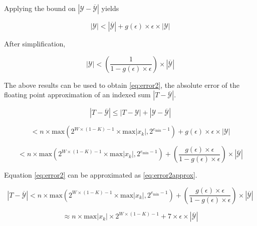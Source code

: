 \documentclass[12pt]{article}
\providecommand{\min}{\ensuremath{\text{min}}}
\providecommand{\max}{\ensuremath{\text{max}}}
\theoremstyle{definition}
\numberwithin{equation}{section}
\numberwithin{figure}{section}
\begin{document}
    Applying the bound on $|\mathcal{Y} - \overline{\mathcal{Y}}|$ yields

    \begin{equation*}
      |\mathcal{Y}| < |\overline{\mathcal{Y}}| + g(\epsilon)\times\epsilon\times|\mathcal{Y}|
    \end{equation*}

    After simplification,

    \begin{equation*}
      |\mathcal{Y}| < (\frac{1}{1 - g(\epsilon)\times\epsilon}) \times |\overline{\mathcal{Y}}|
    \end{equation*}

    The above results can be used to obtain  \eqref{eq:error2}, the absolute error of the floating point approximation of an indexed sum $|T - \overline{\mathcal{Y}}|$.

    \begin{equation*}
      |T - \overline{\mathcal{Y}}| \leq |T - \mathcal{Y}| + |\mathcal{Y} - \overline{\mathcal{Y}}|
    \end{equation*}

    \begin{equation*}
      < n \times \max(2^{W \times (1 - K) - 1} \times \max|x_k|, 2^{e_{\min} - 1}) + g(\epsilon)\times\epsilon\times|\mathcal{Y}|
    \end{equation*}

    \begin{equation}
      < n \times \max(2^{W \times (1 - K) - 1} \times \max|x_k|, 2^{e_{\min} - 1}) + (\frac{g(\epsilon)\times\epsilon}{1 - g(\epsilon)\times\epsilon}) \times |\overline{\mathcal{Y}}|
      \label{eq:error2}
    \end{equation}

    Equation \eqref{eq:error2} can be approximated as  \eqref{eq:error2approx}.

    \begin{equation*}
      |T - \overline{\mathcal{Y}}| < n \times \max(2^{W \times (1 - K) - 1} \times \max|x_k|, 2^{e_{\min} - 1}) + (\frac{g(\epsilon)\times\epsilon}{1 - g(\epsilon)\times\epsilon}) \times |\overline{\mathcal{Y}}|
    \end{equation*}

    \begin{equation}
      \approx n \times \max|x_k|\times 2^{W \times (1 - K) - 1} + 7 \times \epsilon \times |\overline{\mathcal{Y}}|
      \label{eq:error2approx}
    \end{equation}
\end{document}
